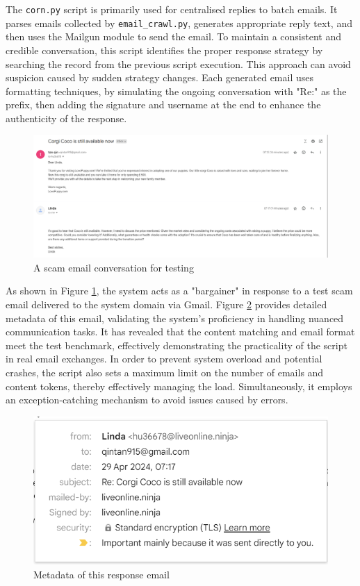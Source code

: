 \documentclass[ oneside,%
                    author={Cassie Qing Tang},
                    degree={BSc},
                     title={An Automated Response System for Disrupting Online Pet Scamming \\ },
                    subtitle={ }]{dissertation}
\begin{document}
The \texttt{corn.py} script is primarily used for centralised replies to batch emails. It parses emails collected by \texttt{email\_crawl.py}, generates appropriate reply text, and then uses the Mailgun module to send the email. To maintain a consistent and credible conversation, this script identifies the proper response strategy by searching the record from the previous script execution. This approach can avoid suspicion caused by sudden strategy changes. Each generated email uses formatting techniques, by simulating the ongoing conversation with "Re:" as the prefix, then adding the signature and username at the end to enhance the authenticity of the response.
\begin{figure}[H]
\centering
\includegraphics[width=\linewidth, height=0.25\textheight]{pic/figure5.png}
\caption{A scam email conversation for testing}
\label{fig:pic5}
\end{figure}

As shown in Figure \ref{fig:pic5}, the system acts as a "bargainer" in response to a test scam email delivered to the system domain via Gmail. Figure \ref{fig:pic6} provides detailed metadata of this email, validating the system's proficiency in handling nuanced communication tasks. It has revealed that the content matching and email format meet the test benchmark, effectively demonstrating the practicality of the script in real email exchanges. In order to prevent system overload and potential crashes, the script also sets a maximum limit on the number of emails and content tokens, thereby effectively managing the load. Simultaneously, it employs an exception-catching mechanism to avoid issues caused by errors.
\begin{figure}[H]
\centering
\includegraphics[width=0.4\linewidth]{pic/figure6.png}
\caption{Metadata of this response email}
\label{fig:pic6}
\end{figure}
\end{document}
